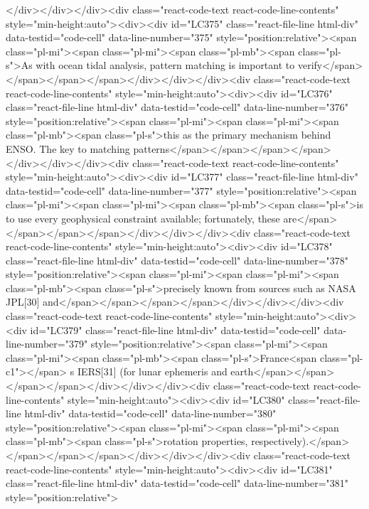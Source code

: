 {{{{{</div></div></div><div class="react-code-text react-code-line-contents" style="min-height:auto"><div><div id="LC375" class="react-file-line html-div" data-testid="code-cell" data-line-number="375" style="position:relative"><span class="pl-mi"><span class="pl-mi"><span class="pl-mb"><span class="pl-s">As with ocean tidal analysis, pattern matching is important to verify</span></span></span></span></div></div></div><div class="react-code-text react-code-line-contents" style="min-height:auto"><div><div id="LC376" class="react-file-line html-div" data-testid="code-cell" data-line-number="376" style="position:relative"><span class="pl-mi"><span class="pl-mi"><span class="pl-mb"><span class="pl-s">this as the primary mechanism behind ENSO. The key to matching patterns</span></span></span></span></div></div></div><div class="react-code-text react-code-line-contents" style="min-height:auto"><div><div id="LC377" class="react-file-line html-div" data-testid="code-cell" data-line-number="377" style="position:relative"><span class="pl-mi"><span class="pl-mi"><span class="pl-mb"><span class="pl-s">is to use every geophysical constraint available; fortunately, these are</span></span></span></span></div></div></div><div class="react-code-text react-code-line-contents" style="min-height:auto"><div><div id="LC378" class="react-file-line html-div" data-testid="code-cell" data-line-number="378" style="position:relative"><span class="pl-mi"><span class="pl-mi"><span class="pl-mb"><span class="pl-s">precisely known from sources such as NASA JPL{[}30{]} and</span></span></span></span></div></div></div><div class="react-code-text react-code-line-contents" style="min-height:auto"><div><div id="LC379" class="react-file-line html-div" data-testid="code-cell" data-line-number="379" style="position:relative"><span class="pl-mi"><span class="pl-mi"><span class="pl-mb"><span class="pl-s">France<span class="pl-c1">\textquotesingle</span> s IERS{[}31{]} (for lunar ephemeris and earth</span></span></span></span></div></div></div><div class="react-code-text react-code-line-contents" style="min-height:auto"><div><div id="LC380" class="react-file-line html-div" data-testid="code-cell" data-line-number="380" style="position:relative"><span class="pl-mi"><span class="pl-mi"><span class="pl-mb"><span class="pl-s">rotation properties, respectively).</span></span></span></span></div></div></div><div class="react-code-text react-code-line-contents" style="min-height:auto"><div><div id="LC381" class="react-file-line html-div" data-testid="code-cell" data-line-number="381" style="position:relative">
}}}}}
